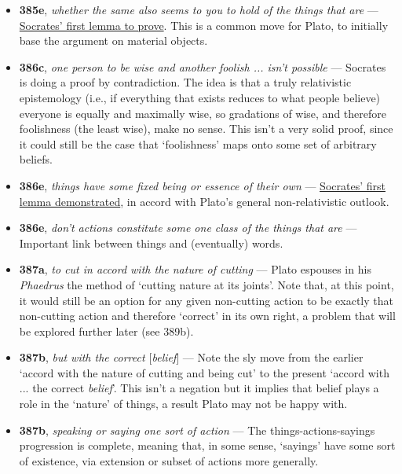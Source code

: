 \documentclass[12pt]{article}
\begin{document}
\begin{itemize}

\item \textbf{385e}, \textit{whether the same also seems to you to hold of the things that are} --- \ul{Socrates' first lemma to prove}. This is a common move for Plato, to initially base the argument on material objects.

\item \textbf{386c}, \textit{one person to be wise and another foolish ... isn't possible} --- Socrates is doing a proof by contradiction. The idea is that a truly relativistic epistemology (i.e., if everything that exists reduces to what people believe) everyone is equally and maximally wise, so gradations of wise, and therefore foolishness (the least wise), make no sense. This isn't a very solid proof, since it could still be the case that `foolishness' maps onto some set of arbitrary beliefs. 

\item \textbf{386e}, \textit{things have some fixed being or essence of their own} --- \ul{Socrates' first lemma demonstrated}, in accord with Plato's general non-relativistic outlook.

\item \textbf{386e}, \textit{don't actions constitute some one class of the things that are} --- Important link between things and (eventually) words.

\item \textbf{387a}, \textit{to cut in accord with the nature of cutting} --- Plato espouses in his \textit{Phaedrus} the method of `cutting nature at its joints'. Note that, at this point, it would still be an option for any given non-cutting action to be exactly that non-cutting action and therefore `correct' in its own right, a problem that will be explored further later (see 389b).

\item \textbf{387b}, \textit{but with the correct $[$belief$]$} --- Note the sly move from the earlier `accord with the nature of cutting and being cut' to the present `accord with ... the correct \textit{belief}'. This isn't a negation but it implies that belief plays a role in the `nature' of things, a result Plato may not be happy with.

\item \textbf{387b}, \textit{speaking or saying one sort of action} --- The things-actions-sayings progression is complete, meaning that, in some sense, `sayings' have some sort of existence, via extension or subset of actions more generally.


\end{itemize}
\end{document}

